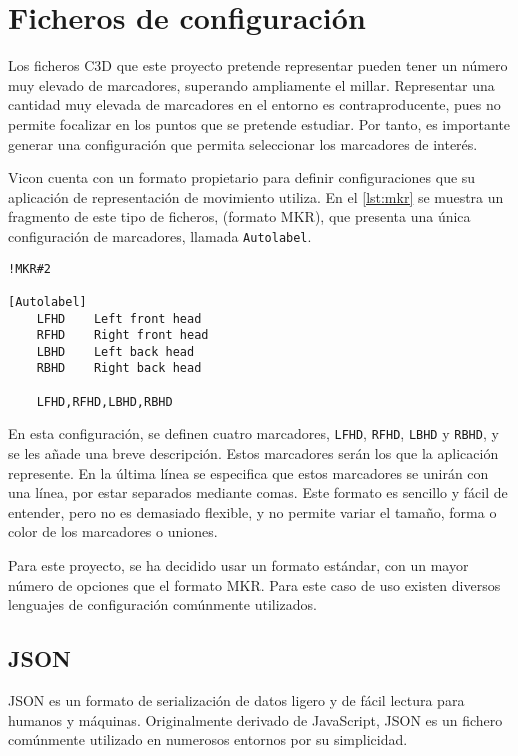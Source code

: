 \section{Ficheros de configuración} \label{sec:ficheros-configuracion}

Los ficheros \ac{C3D} que este proyecto pretende representar pueden tener un número muy elevado de marcadores, superando ampliamente el millar. Representar una cantidad muy elevada de marcadores en el entorno es contraproducente, pues no permite focalizar en los puntos que se pretende estudiar. Por tanto, es importante generar una configuración que permita seleccionar los marcadores de interés.

Vicon cuenta con un formato propietario para definir configuraciones que su aplicación de representación de movimiento utiliza. En el \autoref{lst:mkr} se muestra un fragmento de este tipo de ficheros, (formato MKR), que presenta una única configuración de marcadores, llamada \texttt{Autolabel}.

\begin{lstlisting}[style=mystyle, caption={Fragmento de un fichero MKR}, label=lst:mkr]
!MKR#2

[Autolabel]
	LFHD	Left front head
	RFHD	Right front head
	LBHD	Left back head
	RBHD	Right back head

    LFHD,RFHD,LBHD,RBHD
\end{lstlisting}

En esta configuración, se definen cuatro marcadores, \texttt{LFHD}, \texttt{RFHD}, \texttt{LBHD} y \texttt{RBHD}, y se les añade una breve descripción. Estos marcadores serán los que la aplicación represente. En la última línea se especifica que estos marcadores se unirán con una línea, por estar separados mediante comas. Este formato es sencillo y fácil de entender, pero no es demasiado flexible, y no permite variar el tamaño, forma o color de los marcadores o uniones.

Para este proyecto, se ha decidido usar un formato estándar, con un mayor número de opciones que el formato MKR. Para este caso de uso existen diversos lenguajes de configuración comúnmente utilizados.

\subsection{\acs{JSON}}

\ac{JSON} es un formato de serialización de datos ligero y de fácil lectura para humanos y máquinas. Originalmente derivado de JavaScript, \ac{JSON} es un fichero comúnmente utilizado en numerosos entornos por su simplicidad.

